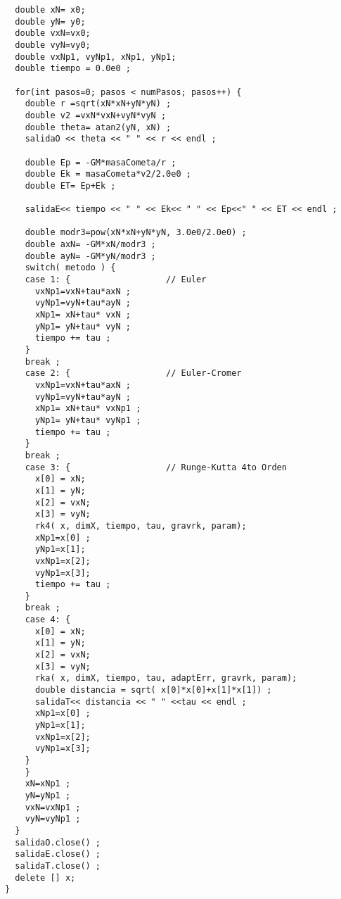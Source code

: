 \begin{verbatim}
  double xN= x0;
  double yN= y0;
  double vxN=vx0;
  double vyN=vy0;
  double vxNp1, vyNp1, xNp1, yNp1;
  double tiempo = 0.0e0 ;

  for(int pasos=0; pasos < numPasos; pasos++) {
    double r =sqrt(xN*xN+yN*yN) ;
    double v2 =vxN*vxN+vyN*vyN ;
    double theta= atan2(yN, xN) ;
    salidaO << theta << " " << r << endl ;

    double Ep = -GM*masaCometa/r ;
    double Ek = masaCometa*v2/2.0e0 ;
    double ET= Ep+Ek ;

    salidaE<< tiempo << " " << Ek<< " " << Ep<<" " << ET << endl ;

    double modr3=pow(xN*xN+yN*yN, 3.0e0/2.0e0) ;
    double axN= -GM*xN/modr3 ;
    double ayN= -GM*yN/modr3 ;
    switch( metodo ) {
    case 1: {                   // Euler
      vxNp1=vxN+tau*axN ;
      vyNp1=vyN+tau*ayN ;
      xNp1= xN+tau* vxN ;
      yNp1= yN+tau* vyN ;
      tiempo += tau ;
    }
    break ;
    case 2: {                   // Euler-Cromer
      vxNp1=vxN+tau*axN ;
      vyNp1=vyN+tau*ayN ;
      xNp1= xN+tau* vxNp1 ;
      yNp1= yN+tau* vyNp1 ;
      tiempo += tau ;
    }
    break ;
    case 3: {                   // Runge-Kutta 4to Orden 
      x[0] = xN;
      x[1] = yN;
      x[2] = vxN;
      x[3] = vyN;
      rk4( x, dimX, tiempo, tau, gravrk, param); 
      xNp1=x[0] ;
      yNp1=x[1];
      vxNp1=x[2];
      vyNp1=x[3];
      tiempo += tau ;
    }
    break ;
    case 4: {
      x[0] = xN;
      x[1] = yN;
      x[2] = vxN;
      x[3] = vyN;
      rka( x, dimX, tiempo, tau, adaptErr, gravrk, param); 
      double distancia = sqrt( x[0]*x[0]+x[1]*x[1]) ;
      salidaT<< distancia << " " <<tau << endl ;
      xNp1=x[0] ;
      yNp1=x[1];
      vxNp1=x[2];
      vyNp1=x[3];
    } 
    }
    xN=xNp1 ;
    yN=yNp1 ;
    vxN=vxNp1 ;
    vyN=vyNp1 ;
  }
  salidaO.close() ;
  salidaE.close() ;
  salidaT.close() ;
  delete [] x;
}

\end{verbatim}
